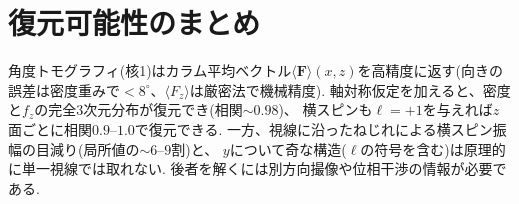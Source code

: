 \documentclass[11pt]{ltjsarticle}
\newcommand{\Fv}{\bm{F}}
\newcommand{\expv}[1]{\langle #1 \rangle}
\begin{document}
\section{復元可能性のまとめ}

角度トモグラフィ(核1)はカラム平均ベクトル$\expv{\Fv}(x,z)$を高精度に返す(向きの誤差は密度重みで$<8^\circ$、$\expv{F_z}$は厳密法で機械精度).
軸対称仮定を加えると、密度と$f_z$の完全3次元分布が復元でき(相関$\sim0.98$)、
横スピンも$\ell=+1$を与えれば$z$面ごとに相関$0.9$--$1.0$で復元できる.
一方、視線に沿ったねじれによる横スピン振幅の目減り(局所値の$\sim6$--$9$割)と、
$y$について奇な構造($\ell$の符号を含む)は原理的に単一視線では取れない.
後者を解くには別方向撮像や位相干渉の情報が必要である.
\end{document}

